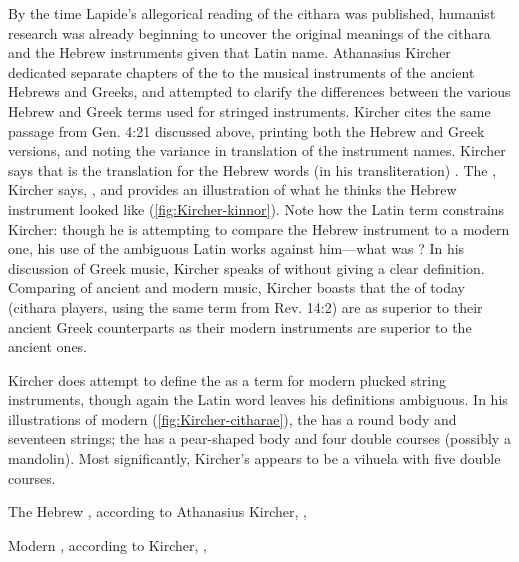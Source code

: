 By the time Lapide's allegorical reading of the cithara was published, humanist
research was already beginning to uncover the original meanings of the cithara
and the Hebrew instruments given that Latin name.
Athanasius Kircher dedicated separate chapters of the  to the
musical instruments of the ancient Hebrews and Greeks, and attempted to clarify
the differences between the various Hebrew and Greek terms used for stringed
instruments.
Kircher cites the same passage from Gen. 4:21 discussed above, printing both
the Hebrew and Greek versions, and noting the variance in translation of the
instrument names.
Kircher says that  is the translation for the Hebrew words (in
his transliteration) .
The , Kircher says, , and provides an illustration of what he thinks
the Hebrew instrument looked like (\cref{fig:Kircher-kinnor}).%
    \autocite[, 44--49]{Kircher:Musurgia} 
Note how the Latin term constrains Kircher: though he is attempting to compare
the Hebrew instrument to a modern one, his use of the ambiguous Latin
 works against him---what was ?
In his discussion of Greek music, Kircher speaks of  without
giving a clear definition.
Comparing of ancient and modern music, Kircher boasts that the
 of today (cithara players, using the same term from Rev.
14:2) are as superior to their ancient Greek counterparts as their modern
instruments are superior to the ancient ones.
    \Autocite[, 548]{Kircher:Musurgia}

Kircher does attempt to define the  as a term for modern
plucked string instruments, though again the Latin word leaves his definitions
ambiguous.
In his illustrations of modern  (\cref{fig:Kircher-citharae}),
the  has a round body and seventeen strings; the
 has a pear-shaped body and four double
courses (possibly a mandolin).
Most significantly, Kircher's  appears to be a vihuela
with five double courses.

{The Hebrew , according to Athanasius Kircher, , }

{Modern , according to Kircher, ,
}

